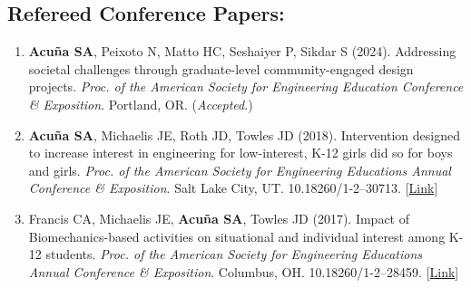 \documentclass[letterpaper, 10pt]{article}
\begin{document}
\subsection{Refereed Conference Papers:}
\begin{enumerate}
     \item \textbf{Acuña SA}, Peixoto N, Matto HC, Seshaiyer P, Sikdar S (2024). Addressing societal challenges through graduate-level community-engaged design projects. \textit{Proc. of the American Society for Engineering Education Conference \& Exposition}. Portland, OR. (\textit{Accepted}.) %
     \item \textbf{Acuña SA}, Michaelis JE, Roth JD, Towles JD (2018). Intervention designed to increase interest in engineering for low-interest, K-12 girls did so for boys and girls. \textit{Proc. of the American Society for Engineering Educations Annual Conference \& Exposition}. Salt Lake City, UT. 10.18260/1-2--30713. [\href{https://peer.asee.org/intervention-designed-to-increase-interest-in-engineering-for-low-interest-k-12-girls-did-so-for-boys-and-girls}{Link}] %
     \item Francis CA, Michaelis JE, \textbf{Acuña SA}, Towles JD (2017). Impact of Biomechanics-based activities on situational and individual interest among K-12 students. \textit{Proc. of the American Society for Engineering Educations Annual Conference \& Exposition}. Columbus, OH. 10.18260/1-2--28459. [\href{https://peer.asee.org/impact-of-biomechanics-based-activities-on-situational-and-individual-interest-among-k-12-students}{Link}] %
\end{enumerate}
\end{document}
